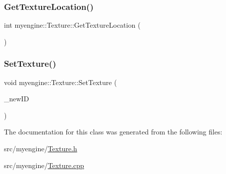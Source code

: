 \subsubsection{\texorpdfstring{Get\+Texture\+Location()}{GetTextureLocation()}}
{\footnotesize\ttfamily int myengine\+::\+Texture\+::\+Get\+Texture\+Location (\begin{DoxyParamCaption}{ }\end{DoxyParamCaption})}

\mbox{\label{classmyengine_1_1_texture_af178f6cbc4278bcc884a5651025d3dd9}} 
\subsubsection{\texorpdfstring{Set\+Texture()}{SetTexture()}}
{\footnotesize\ttfamily void myengine\+::\+Texture\+::\+Set\+Texture (\begin{DoxyParamCaption}\item[{G\+Luint}]{\+\_\+new\+ID }\end{DoxyParamCaption})}



The documentation for this class was generated from the following files\+:\begin{DoxyCompactItemize}
\item 
src/myengine/\hyperlink{_texture_8h}{Texture.\+h}\item 
src/myengine/\hyperlink{_texture_8cpp}{Texture.\+cpp}\end{DoxyCompactItemize}

